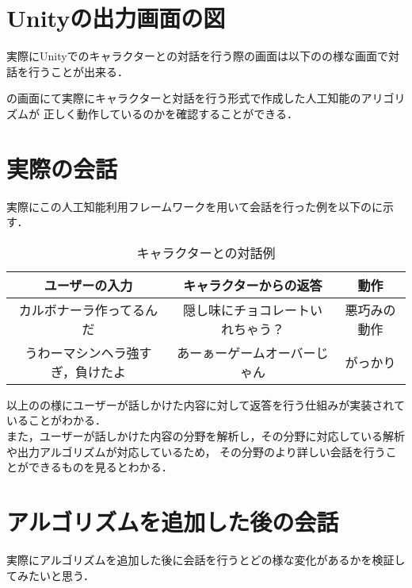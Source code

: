 
\section{Unityの出力画面の図}
実際にUnityでのキャラクターとの対話を行う際の画面は以下のの様な画面で対話を行うことが出来る．


の画面にて実際にキャラクターと対話を行う形式で作成した人工知能のアリゴリズムが
正しく動作しているのかを確認することができる．\\


\section{実際の会話}
実際にこの人工知能利用フレームワークを用いて会話を行った例を以下のに示す．\\

\begin{table}[tbh]
	\caption{キャラクターとの対話例} \label{tab:Chat}
	\begin{center}
		\begin{tabular}[htb]{c|c|c}
		\hline
		ユーザーの入力 & キャラクターからの返答 & 動作 \\
		\hline
		カルボナーラ作ってるんだ & 隠し味にチョコレートいれちゃう？ & 悪巧みの動作 \\
		うわーマシンヘラ強すぎ，負けたよ & あーぁーゲームオーバーじゃん & がっかり \\
		\hline
		\end{tabular}
	\end{center}
\end{table}

以上のの様にユーザーが話しかけた内容に対して返答を行う仕組みが実装されていることがわかる．\\

また，ユーザーが話しかけた内容の分野を解析し，その分野に対応している解析や出力アルゴリズムが対応しているため，
その分野のより詳しい会話を行うことができるものを見るとわかる．\\


\section{アルゴリズムを追加した後の会話}
実際にアルゴリズムを追加した後に会話を行うとどの様な変化があるかを検証してみたいと思う．\\


